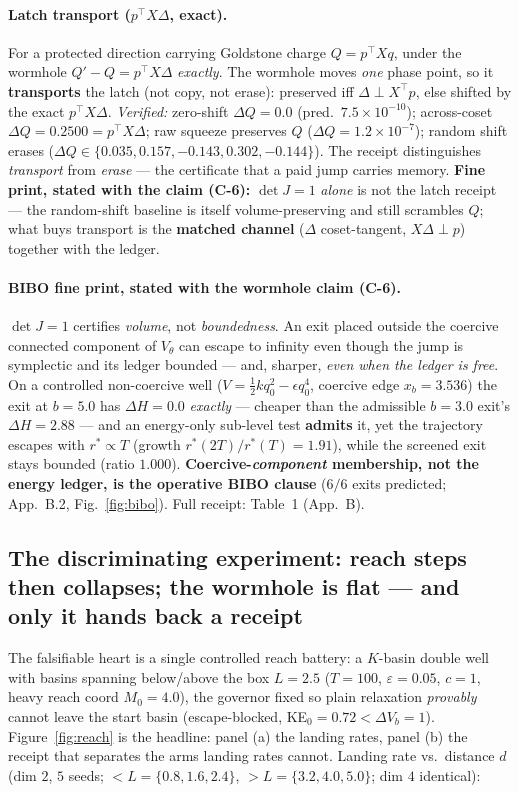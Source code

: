 \documentclass[11pt]{article}
\newcommand{\half}{\tfrac12}
\newcommand{\detJ}{\det J}
\begin{document}
\paragraph{Latch transport ($p^\top X\Delta$, exact).} For a protected direction carrying Goldstone charge $Q=p^\top X q$, under the wormhole $Q'-Q=p^\top X\Delta$ \emph{exactly}. The wormhole moves \emph{one} phase point, so it \textbf{transports} the latch (not copy, not erase): preserved iff $\Delta\perp X^\top p$, else shifted by the exact $p^\top X\Delta$. \emph{Verified:} zero-shift $\Delta Q=0.0$ (pred.\ $7.5{\times}10^{-10}$); across-coset $\Delta Q=0.2500=p^\top X\Delta$; raw squeeze preserves $Q$ ($\Delta Q=1.2{\times}10^{-7}$); random shift erases ($\Delta Q\in\{0.035,0.157,-0.143,0.302,-0.144\}$). The receipt distinguishes \emph{transport} from \emph{erase} --- the certificate that a paid jump carries memory. \textbf{Fine print, stated with the claim (C-6):} $\detJ=1$ \emph{alone} is not the latch receipt --- the random-shift baseline is itself volume-preserving and still scrambles $Q$; what buys transport is the \textbf{matched channel} ($\Delta$ coset-tangent, $X\Delta\perp p$) together with the ledger.

\paragraph{BIBO fine print, stated with the wormhole claim (C-6).} $\detJ=1$ certifies \emph{volume}, not \emph{boundedness}. An exit placed outside the coercive connected component of $V_\theta$ can escape to infinity even though the jump is symplectic and its ledger bounded --- and, sharper, \emph{even when the ledger is free}. On a controlled non-coercive well ($V=\half kq_0^2-\epsilon q_0^4$, coercive edge $x_b=3.536$) the exit at $b=5.0$ has $\Delta H=0.0$ \emph{exactly} --- cheaper than the admissible $b=3.0$ exit's $\Delta H=2.88$ --- and an energy-only sub-level test \textbf{admits} it, yet the trajectory escapes with $r^\ast\propto T$ (growth $r^\ast(2T)/r^\ast(T)=1.91$), while the screened exit stays bounded (ratio $1.000$). \textbf{Coercive-\emph{component} membership, not the energy ledger, is the operative BIBO clause} ($6/6$ exits predicted; App.~B.2, Fig.~\ref{fig:bibo}). Full receipt: Table~1 (App.~B).

\subsection{The discriminating experiment: reach steps then collapses; the wormhole is flat --- and only it hands back a receipt}
The falsifiable heart is a single controlled reach battery: a $K$-basin double well with basins spanning below/above the box $L=2.5$ ($T=100$, $\varepsilon=0.05$, $c=1$, heavy reach coord $M_0=4.0$), the governor fixed so plain relaxation \emph{provably} cannot leave the start basin (escape-blocked, KE$_0=0.72<\Delta V_b=1$). Figure~\ref{fig:reach} is the headline: panel (a) the landing rates, panel (b) the receipt that separates the arms landing rates cannot. Landing rate vs.\ distance $d$ (dim $2$, $5$ seeds; $<L=\{0.8,1.6,2.4\}$, $>L=\{3.2,4.0,5.0\}$; dim $4$ identical):
\end{document}
